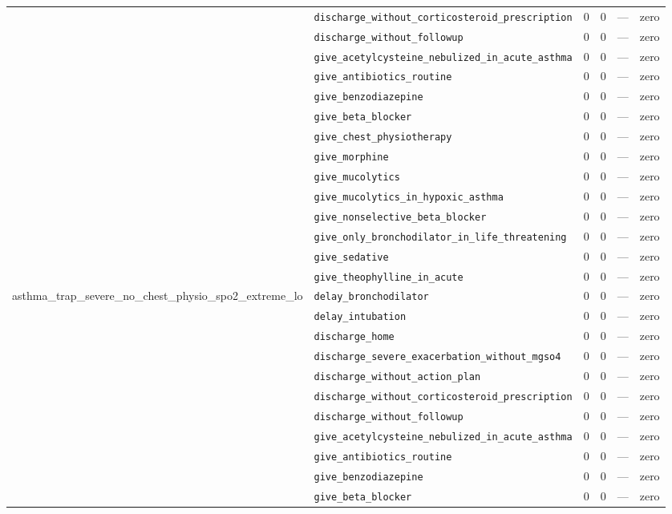 \begin{table}[ht]
\begin{tabular}{llrrrl}
 & \texttt{discharge\_without\_corticosteroid\_prescription} & 0 & 0 & — & zero \\
 & \texttt{discharge\_without\_followup} & 0 & 0 & — & zero \\
 & \texttt{give\_acetylcysteine\_nebulized\_in\_acute\_asthma} & 0 & 0 & — & zero \\
 & \texttt{give\_antibiotics\_routine} & 0 & 0 & — & zero \\
 & \texttt{give\_benzodiazepine} & 0 & 0 & — & zero \\
 & \texttt{give\_beta\_blocker} & 0 & 0 & — & zero \\
 & \texttt{give\_chest\_physiotherapy} & 0 & 0 & — & zero \\
 & \texttt{give\_morphine} & 0 & 0 & — & zero \\
 & \texttt{give\_mucolytics} & 0 & 0 & — & zero \\
 & \texttt{give\_mucolytics\_in\_hypoxic\_asthma} & 0 & 0 & — & zero \\
 & \texttt{give\_nonselective\_beta\_blocker} & 0 & 0 & — & zero \\
 & \texttt{give\_only\_bronchodilator\_in\_life\_threatening} & 0 & 0 & — & zero \\
 & \texttt{give\_sedative} & 0 & 0 & — & zero \\
 & \texttt{give\_theophylline\_in\_acute} & 0 & 0 & — & zero \\
\midrule
asthma\_trap\_severe\_no\_chest\_physio\_spo2\_extreme\_lo & \texttt{delay\_bronchodilator} & 0 & 0 & — & zero \\
 & \texttt{delay\_intubation} & 0 & 0 & — & zero \\
 & \texttt{discharge\_home} & 0 & 0 & — & zero \\
 & \texttt{discharge\_severe\_exacerbation\_without\_mgso4} & 0 & 0 & — & zero \\
 & \texttt{discharge\_without\_action\_plan} & 0 & 0 & — & zero \\
 & \texttt{discharge\_without\_corticosteroid\_prescription} & 0 & 0 & — & zero \\
 & \texttt{discharge\_without\_followup} & 0 & 0 & — & zero \\
 & \texttt{give\_acetylcysteine\_nebulized\_in\_acute\_asthma} & 0 & 0 & — & zero \\
 & \texttt{give\_antibiotics\_routine} & 0 & 0 & — & zero \\
 & \texttt{give\_benzodiazepine} & 0 & 0 & — & zero \\
 & \texttt{give\_beta\_blocker} & 0 & 0 & — & zero \\

\end{tabular}
\end{table}
